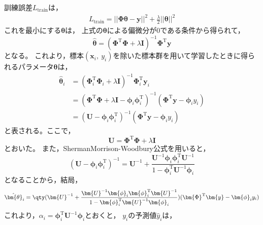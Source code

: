 \documentclass[class=jsarticle, crop=false, dvipdfmx, fleqn]{standalone}
\begin{document}
訓練誤差\(L_\mathrm{train}\)は，
\begin{align}
    L_\mathrm{train} = ||\bm{\Phi \theta} - \bm{y} ||^2 + \frac{\lambda}{2} ||\bm{\theta}||^2
\end{align}
これを最小にする\(\bm{\theta}\)は，
上式の\(\bm{\theta}\)による偏微分が0である条件から得られて，
\begin{equation}
    \hat{\bm{\theta}} = (\bm{\Phi}^\mathrm{T} \bm{\Phi} + \lambda \bm{I})^{-1} \bm{\Phi}^\mathrm{T} \bm{y}
\end{equation}
となる。
これより，標本\((\bm{x}_i,\ y_i)\)を除いた標本群を用いて学習したときに得られるパラメータ\(\bm{\theta}\)は，
\begin{align}
    \hat{\bm{\theta}}_i
        & = (\bm{\Phi}_i^\mathrm{T} \bm{\Phi}_i + \lambda \bm{I})^{-1} \bm{\Phi}_i^\mathrm{T} \bm{y}_i \\
        & = (\bm{\Phi}^\mathrm{T} \bm{\Phi} + \lambda \bm{I} - \bm{\phi}_i \bm{\phi}_i^\mathrm{T})^{-1} (\bm{\Phi}^\mathrm{T} \bm{y} - \bm{\phi}_i y_i) \\
        & = (\bm{U} - \bm{\phi}_i \bm{\phi}_i^\mathrm{T})^{-1} (\bm{\Phi}^\mathrm{T} \bm{y} - \bm{\phi}_i y_i)
\end{align}
と表される。ここで，
\begin{equation}
    \bm{U} = \bm{\Phi}^\mathrm{T} \bm{\Phi} + \lambda \bm{I}
\end{equation}
とおいた。
また，ShermanMorrison-Woodbury公式を用いると，
\begin{equation}
    (\bm{U} - \bm{\phi}_i \bm{\phi}_i^\mathrm{T})^{-1}
    =
    \bm{U}^{-1} + \frac{\bm{U}^{-1} \bm{\phi}_i \bm{\phi}_i^\mathrm{T} \bm{U}^{-1}}{1 - \bm{\phi}_i^\mathrm{T} \bm{U}^{-1} \bm{\phi}_i}
\end{equation}
となることから，結局，
\begin{equation}
    \hat{\bm{\theta}}_i = \qty(\bm{U}^{-1} + \frac{\bm{U}^{-1} \bm{\phi}_i \bm{\phi}_i^\mathrm{T} \bm{U}^{-1}}{1 - \bm{\phi}_i^\mathrm{T} \bm{U}^{-1} \bm{\phi}_i}) (\bm{\Phi}^\mathrm{T} \bm{y} - \bm{\phi}_i y_i)
\end{equation}
これより，\(\alpha_i = \bm{\phi}_i^\mathrm{T} \bm{U}^{-1} \bm{\phi}_i\)とおくと，
\(y_i\)の予測値\(\hat{y}_i\)は，
\end{document}
